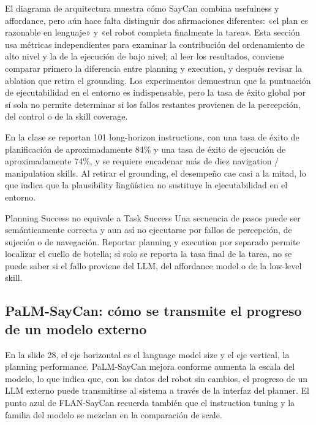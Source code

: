 El diagrama de arquitectura muestra cómo SayCan combina usefulness y affordance, pero aún hace falta distinguir dos afirmaciones diferentes: «el plan es razonable en lenguaje» y «el robot completa finalmente la tarea». Esta sección usa métricas independientes para examinar la contribución del ordenamiento de alto nivel y la de la ejecución de bajo nivel; al leer los resultados, conviene comparar primero la diferencia entre planning y execution, y después revisar la ablation que retira el grounding. Los experimentos demuestran que la puntuación de ejecutabilidad en el entorno es indispensable, pero la tasa de éxito global por sí sola no permite determinar si los fallos restantes provienen de la percepción, del control o de la skill coverage.

En la clase se reportan 101 long-horizon instructions, con una tasa de éxito de planificación de aproximadamente 84\% y una tasa de éxito de ejecución de aproximadamente 74\%, y se requiere encadenar más de diez navigation / manipulation skills. Al retirar el grounding, el desempeño cae casi a la mitad, lo que indica que la plausibility lingüística no sustituye la ejecutabilidad en el entorno.


\begin{warningbox}{Planning Success no equivale a Task Success}
Una secuencia de pasos puede ser semánticamente correcta y aun así no ejecutarse por fallos de percepción, de sujeción o de navegación. Reportar planning y execution por separado permite localizar el cuello de botella; si solo se reporta la tasa final de la tarea, no se puede saber si el fallo proviene del LLM, del affordance model o de la low-level skill.
\end{warningbox}

\subsection{PaLM-SayCan: cómo se transmite el progreso de un modelo externo}

En la slide 28, el eje horizontal es el language model size y el eje vertical, la planning performance. PaLM-SayCan mejora conforme aumenta la escala del modelo, lo que indica que, con los datos del robot sin cambios, el progreso de un LLM externo puede transmitirse al sistema a través de la interfaz del planner. El punto azul de FLAN-SayCan recuerda también que el instruction tuning y la familia del modelo se mezclan en la comparación de scale.

